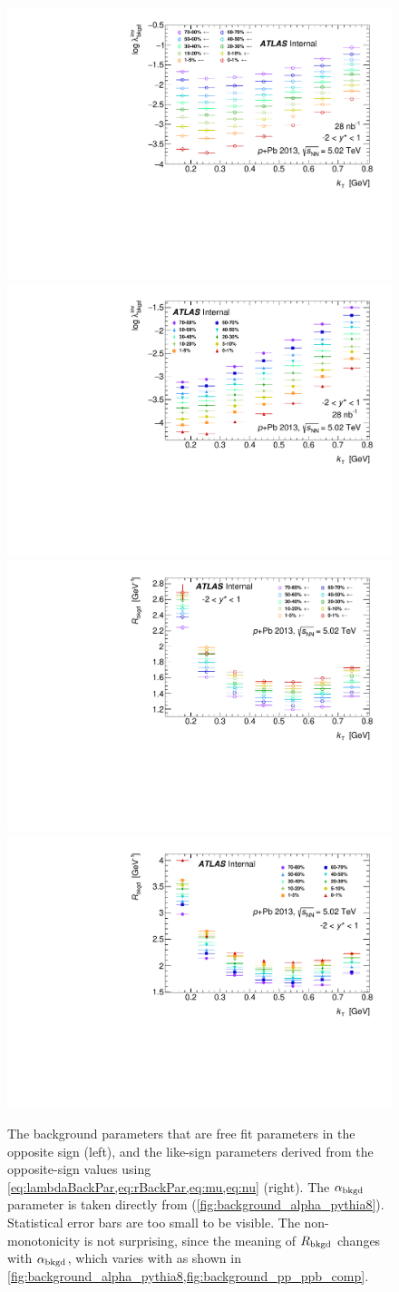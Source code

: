 \begin{figure}[t]
\begin{minipage}[t]{1.0\textwidth}
\centering
\includegraphics[width=.49\linewidth]{canqinv_backLambda_vs_kt_opp.pdf}
\includegraphics[width=.49\linewidth]{canqinv_backLambda_vs_kt_same.pdf}\\
\includegraphics[width=.49\linewidth]{canqinv_backR_vs_kt_opp.pdf}
\includegraphics[width=.49\linewidth]{canqinv_backR_vs_kt_same.pdf}\\
\end{minipage}
\caption{The background parameters that are free fit parameters in the opposite sign (left), and the like-sign parameters derived from the opposite-sign values using \cref{eq:lambdaBackPar,eq:rBackPar,eq:mu,eq:nu} (right). The $\alpha_{\mathrm{bkgd}}$ parameter is taken directly from \PYEight (\cref{fig:background_alpha_pythia8}). Statistical error bars are too small to be visible. The non-monotonicity is not surprising, since the meaning of $R_{\mathrm{bkgd}}$ changes with $\alpha_{\mathrm{bkgd}}$, which varies with \kt as shown in \cref{fig:background_alpha_pythia8,fig:background_pp_ppb_comp}.}
\label{fig:background_data}
\end{figure}


